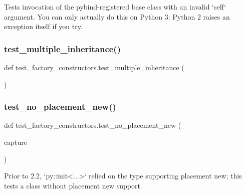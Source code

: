 \begin{DoxyVerb}Tests invocation of the pybind-registered base class with an invalid `self` argument.  You
can only actually do this on Python 3: Python 2 raises an exception itself if you try.\end{DoxyVerb}
 \mbox{\label{namespacetest__factory__constructors_ad9942dd4c8ef1d6cfdbdeb520b249fd7}} 
\subsubsection{\texorpdfstring{test\_multiple\_inheritance()}{test\_multiple\_inheritance()}}
{\footnotesize\ttfamily def test\+\_\+factory\+\_\+constructors.\+test\+\_\+multiple\+\_\+inheritance (\begin{DoxyParamCaption}{ }\end{DoxyParamCaption})}

\mbox{\label{namespacetest__factory__constructors_a3faaafdd3871dd00ba7adcd9d5484897}} 
\subsubsection{\texorpdfstring{test\_no\_placement\_new()}{test\_no\_placement\_new()}}
{\footnotesize\ttfamily def test\+\_\+factory\+\_\+constructors.\+test\+\_\+no\+\_\+placement\+\_\+new (\begin{DoxyParamCaption}\item[{}]{capture }\end{DoxyParamCaption})}

\begin{DoxyVerb}Prior to 2.2, `py::init<...>` relied on the type supporting placement
new; this tests a class without placement new support.\end{DoxyVerb}
 \mbox{\label{namespacetest__factory__constructors_ad053d88bf7b6fbf61c28b01872b4ffa9}} 
